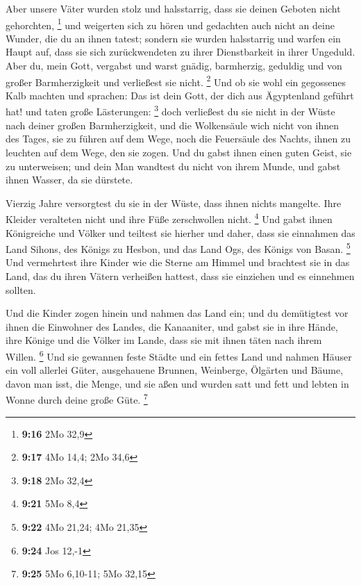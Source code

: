  Aber unsere Väter wurden stolz und halsstarrig, dass sie
deinen Geboten nicht gehorchten, \footnote{\textbf{9:16} 2Mo 32,9}
 und weigerten sich zu hören und gedachten auch nicht an
deine Wunder, die du an ihnen tatest; sondern sie wurden halsstarrig und
warfen ein Haupt auf, dass sie sich zurückwendeten zu ihrer
Dienstbarkeit in ihrer Ungeduld. Aber du, mein Gott, vergabst und warst
gnädig, barmherzig, geduldig und von großer Barmherzigkeit und
verließest sie nicht. \footnote{\textbf{9:17} 4Mo 14,4; 2Mo 34,6}
 Und ob sie wohl ein gegossenes Kalb machten und sprachen:
Das ist dein Gott, der dich aus Ägyptenland geführt hat! und taten große
Lästerungen: \footnote{\textbf{9:18} 2Mo 32,4}  doch
verließest du sie nicht in der Wüste nach deiner großen Barmherzigkeit,
und die Wolkensäule wich nicht von ihnen des Tages, sie zu führen auf
dem Wege, noch die Feuersäule des Nachts, ihnen zu leuchten auf dem
Wege, den sie zogen.  Und du gabst ihnen einen guten Geist,
sie zu unterweisen; und dein Man wandtest du nicht von ihrem Munde, und
gabst ihnen Wasser, da sie dürstete.

 Vierzig Jahre versorgtest du sie in der Wüste, dass ihnen
nichts mangelte. Ihre Kleider veralteten nicht und ihre Füße
zerschwollen nicht. \footnote{\textbf{9:21} 5Mo 8,4}  Und
gabst ihnen Königreiche und Völker und teiltest sie hierher und daher,
dass sie einnahmen das Land Sihons, des Königs zu Hesbon, und das Land
Ogs, des Königs von Basan. \footnote{\textbf{9:22} 4Mo 21,24; 4Mo 21,35}
 Und vermehrtest ihre Kinder wie die Sterne am Himmel und
brachtest sie in das Land, das du ihren Vätern verheißen hattest, dass
sie einziehen und es einnehmen sollten.

 Und die Kinder zogen hinein und nahmen das Land ein; und
du demütigtest vor ihnen die Einwohner des Landes, die Kanaaniter, und
gabst sie in ihre Hände, ihre Könige und die Völker im Lande, dass sie
mit ihnen täten nach ihrem Willen. \footnote{\textbf{9:24} Jos 12,-1}
 Und sie gewannen feste Städte und ein fettes Land und
nahmen Häuser ein voll allerlei Güter, ausgehauene Brunnen, Weinberge,
Ölgärten und Bäume, davon man isst, die Menge, und sie aßen und wurden
satt und fett und lebten in Wonne durch deine große Güte. \footnote{\textbf{9:25}
  5Mo 6,10-11; 5Mo 32,15}

